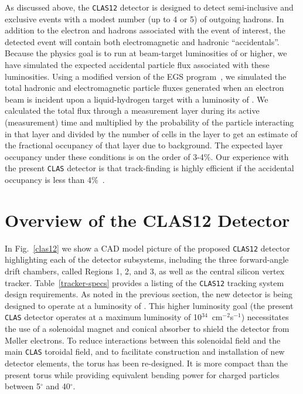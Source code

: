 As discussed above, the {\tt CLAS12} detector is designed to detect 
semi-inclusive and exclusive events with a modest number (up to 4 or 5) 
of outgoing hadrons.  In addition to the electron and hadrons associated 
with the event of interest, the detected event will contain both 
electromagnetic and hadronic ``accidentals''.  Because the physics goal is 
to run at beam-target luminosities of  or higher, we have simulated 
the expected accidental particle flux associated with these luminosities.
Using a modified version of the EGS program~\cite{egs}, we simulated the 
total hadronic and electromagnetic particle fluxes generated when an 
electron beam is incident upon a liquid-hydrogen target with a luminosity 
of .  We calculated the total flux through a measurement layer during 
its active (measurement) time and multiplied by the probability of the 
particle interacting in that layer and divided by the number of cells in 
the layer to get an estimate of the fractional occupancy of that layer due 
to background. The expected layer occupancy under these conditions is
on the order of 3-4\%.  Our experience with the present {\tt CLAS} detector 
is that track-finding is highly efficient if the accidental occupancy is 
less than 4\%~\cite{dcnim}.  

\section{Overview of the CLAS12 Detector}

In Fig.~\ref{clas12} we show a CAD model picture of the proposed 
{\tt CLAS12} detector highlighting each of the detector subsystems, 
including the three forward-angle drift chambers, called Regions 1, 2, 
and 3, as well as the central silicon vertex tracker.  
Table~\ref{tracker-specs} provides a listing of the {\tt CLAS12} tracking 
system design requirements.  As noted in the previous section, the new 
detector is being designed to operate at a luminosity of .  This 
higher luminosity goal (the present {\tt CLAS} detector operates at a 
maximum luminosity of 10$^{34}$~cm$^{-2}$s$^{-1}$) necessitates the use 
of a solenoidal magnet and conical absorber to shield the detector from 
M{\o}ller electrons.  To reduce interactions between this solenoidal field 
and the main {\tt CLAS} toroidal field, and to facilitate construction and 
installation of new detector elements, the torus has been re-designed.  It 
is more compact than the present torus while providing equivalent bending 
power for charged particles between 5$^{\circ}$ and 40$^{\circ}$.

